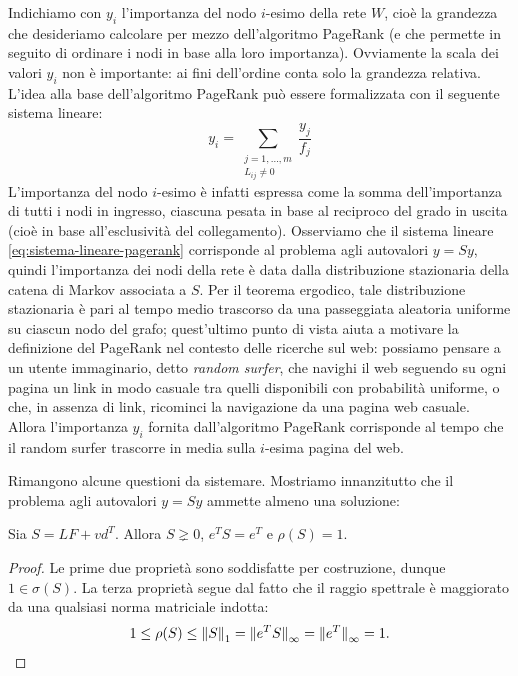 Indichiamo con $y_i$ l'importanza del nodo $i$-esimo della rete $W$,
cioè la grandezza che desideriamo calcolare per mezzo dell'algoritmo PageRank
(e che permette in seguito di ordinare i nodi in base alla loro importanza).
Ovviamente la scala dei valori $y_i$ non è importante: ai fini dell'ordine
conta solo la grandezza relativa.
L'idea alla base dell'algoritmo PageRank può essere formalizzata con il
seguente sistema lineare:
\begin{equation} \label{eq:sistema-lineare-pagerank}
y_i = \sum_{\substack{j = 1,\dots,m \\ L_{ij} \neq 0}} \frac{y_j}{f_j}
\end{equation}
L'importanza del nodo $i$-esimo è infatti espressa come la somma
dell'importanza di tutti i nodi in ingresso, ciascuna pesata
in base al reciproco del grado in uscita (cioè in base all'esclusività
del collegamento). Osserviamo che il sistema lineare \eqref{eq:sistema-lineare-pagerank}
corrisponde al problema agli autovalori $y = Sy$, quindi l'importanza dei nodi
della rete è data dalla distribuzione stazionaria della catena di Markov associata a $S$.
Per il teorema ergodico, tale distribuzione stazionaria è pari al tempo
medio trascorso da una passeggiata aleatoria uniforme su ciascun nodo del grafo;
quest'ultimo punto di vista aiuta a motivare la definizione del PageRank
nel contesto delle ricerche sul web: possiamo pensare a un utente immaginario,
detto \emph{random surfer}, che navighi il web seguendo su ogni pagina
un link in modo casuale tra quelli disponibili con probabilità uniforme,
o che, in assenza di link, ricominci la navigazione da una pagina web casuale.
Allora l'importanza $y_i$ fornita dall'algoritmo PageRank corrisponde
al tempo che il random surfer trascorre in media sulla $i$-esima pagina del web.

Rimangono alcune questioni da sistemare.
Mostriamo innanzitutto che il problema agli autovalori $y = Sy$ ammette
almeno una soluzione:

\begin{teor}
Sia $S = LF + vd^T$. Allora $S \gneq 0$, $e^T S = e^T$ e $\rho(S) = 1$.
\end{teor}

\begin{proof}
Le prime due proprietà sono soddisfatte per costruzione, dunque
$1 \in \sigma(S)$. La terza proprietà segue dal fatto che il raggio
spettrale è maggiorato da una qualsiasi norma matriciale indotta:
\[
1
\leq \rho(S)
\leq \left\lVert S\right\rVert_1
= \left\lVert\smash{e^T S}\right\rVert_{\infty}
= \left\lVert\smash{e^T}\right\rVert_{\infty}
= 1. \qedhere
\]
\end{proof}

